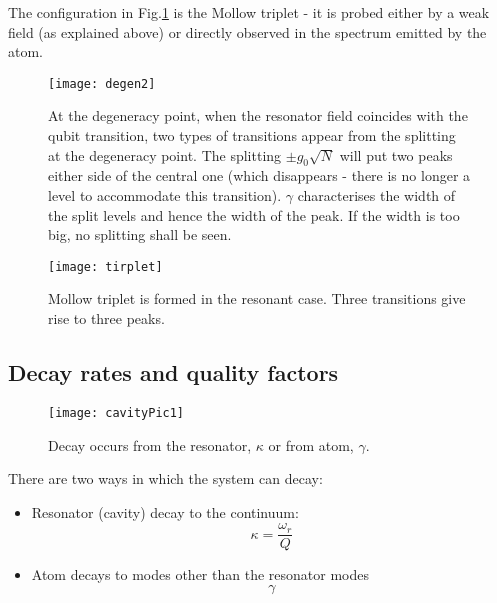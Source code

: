 The  configuration  in Fig.\ref{qrDegen2}  is
the Mollow triplet - it is probed either by a
weak field  (as explained above)  or directly
observed in the spectrum emitted by the atom.


\begin{figure}
  \texttt{[image: degen2]}
  \caption{At the degeneracy  point, when the
    resonator field coincides  with the qubit
    transition,  two   types  of  transitions
    appear   from   the  splitting   at   the
    degeneracy    point.     The    splitting
    $ \pm  g_0\sqrt{N} $  will put  two peaks
    either  side of  the  central one  (which
    disappears -  there is no longer  a level
    to    accommodate    this    transition).
    $  \gamma $  characterises  the  width of  the
    split levels  and hence the width  of the
    peak.   If  the  width  is  too  big,  no
    splitting shall be seen.\label{qrDegen2}}
\end{figure}

\begin{figure}
  \texttt{[image: tirplet]}
  \caption{Mollow  triplet is  formed in  the
    resonant  case.   Three transitions  give
    rise to three peaks.\label{qrMollow}}
\end{figure}

\subsection{Decay rates and quality factors}
\label{sec:decay-rates-quality}

\begin{figure}[h]
  \centering
  \texttt{[image: cavityPic1]}
  \caption{Decay  occurs from  the resonator,
    $\kappa$ or from atom, $\gamma$.}
\end{figure}

There are  two ways  in which the  system can
decay:

\begin{itemize}
\item   Resonator  (cavity)   decay  to   the
  continuum:
  \begin{equation}
    \kappa = \frac{\omega_{r}}{Q}
  \end{equation}

\item  Atom decays  to modes  other than  the
  resonator modes
  \begin{equation}
    \gamma
  \end{equation}
\end{itemize}

